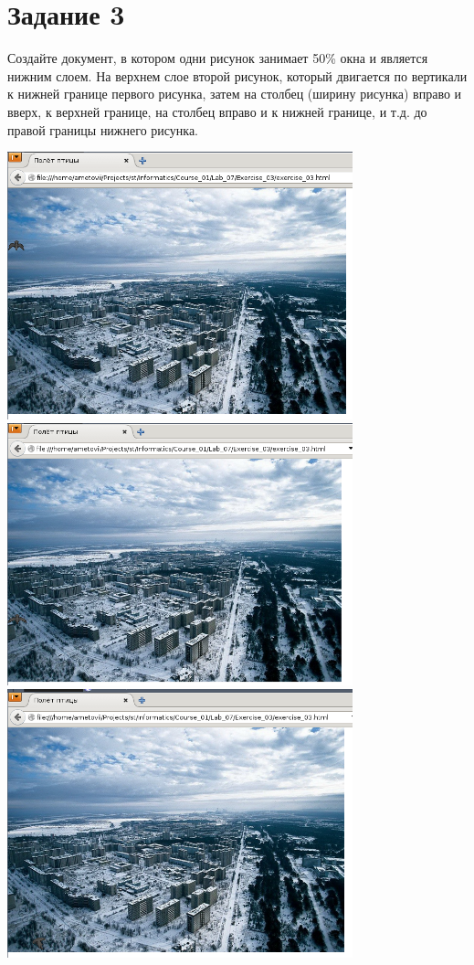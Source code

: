 \section{Задание 3}

Создайте документ, в котором одни рисунок занимает 50\% окна и является нижним слоем. На верхнем слое второй рисунок, который двигается по вертикали к нижней границе первого рисунка, затем на столбец (ширину рисунка) вправо и вверх, к верхней границе, на столбец вправо и к нижней границе, и т.д. до правой границы нижнего рисунка.

\begin{center}
  \includegraphics[width=10cm]{img/Exercise_03/01.png}
  \includegraphics[width=10cm]{img/Exercise_03/02.png}
  \includegraphics[width=10cm]{img/Exercise_03/03.png}

\end{center}
